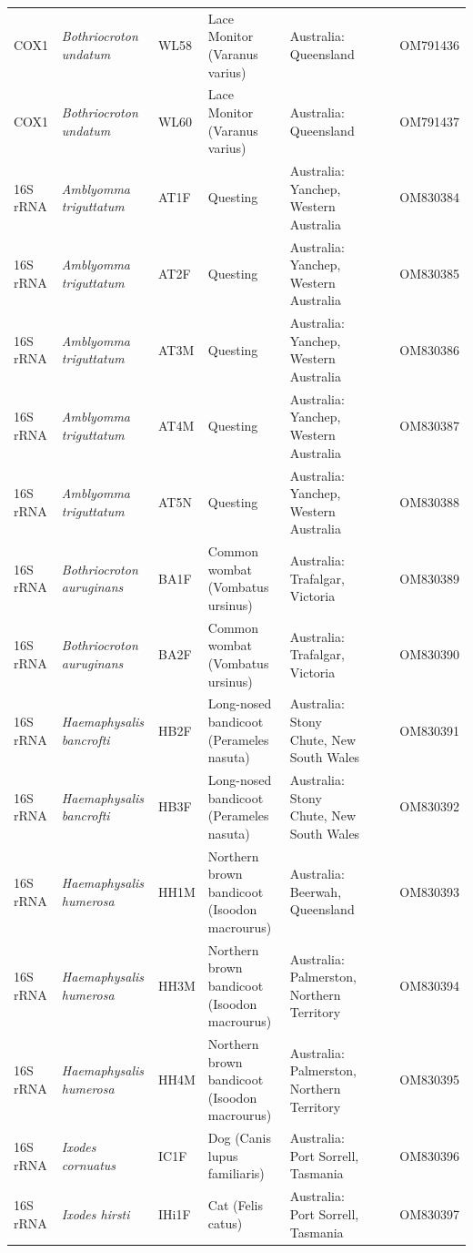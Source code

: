 \documentclass[a4paper, nobind]{templates/ociamthesis}
\begin{document}
\begin{landscape}
\begin{longtable}[t]{l>{}lllllll}
COX1 & \em{Bothriocroton undatum} & WL58 & Lace Monitor (Varanus varius) & Australia: Queensland &  &  & OM791436\\
COX1 & \em{Bothriocroton undatum} & WL60 & Lace Monitor (Varanus varius) & Australia: Queensland &  &  & OM791437\\
16S rRNA & \em{Amblyomma triguttatum} & AT1F & Questing & Australia: Yanchep, Western Australia &  &  & OM830384\\
16S rRNA & \em{Amblyomma triguttatum} & AT2F & Questing & Australia: Yanchep, Western Australia &  &  & OM830385\\
16S rRNA & \em{Amblyomma triguttatum} & AT3M & Questing & Australia: Yanchep, Western Australia &  &  & OM830386\\
16S rRNA & \em{Amblyomma triguttatum} & AT4M & Questing & Australia: Yanchep, Western Australia &  &  & OM830387\\
16S rRNA & \em{Amblyomma triguttatum} & AT5N & Questing & Australia: Yanchep, Western Australia &  &  & OM830388\\
16S rRNA & \em{Bothriocroton auruginans} & BA1F & Common wombat (Vombatus ursinus) & Australia: Trafalgar, Victoria &  &  & OM830389\\
16S rRNA & \em{Bothriocroton auruginans} & BA2F & Common wombat (Vombatus ursinus) & Australia: Trafalgar, Victoria &  &  & OM830390\\
16S rRNA & \em{Haemaphysalis bancrofti} & HB2F & Long-nosed bandicoot (Perameles nasuta) & Australia: Stony Chute, New South Wales &  &  & OM830391\\
16S rRNA & \em{Haemaphysalis bancrofti} & HB3F & Long-nosed bandicoot (Perameles nasuta) & Australia: Stony Chute, New South Wales &  &  & OM830392\\
16S rRNA & \em{Haemaphysalis humerosa} & HH1M & Northern brown bandicoot (Isoodon macrourus) & Australia: Beerwah, Queensland &  &  & OM830393\\
16S rRNA & \em{Haemaphysalis humerosa} & HH3M & Northern brown bandicoot (Isoodon macrourus) & Australia: Palmerston, Northern Territory &  &  & OM830394\\
16S rRNA & \em{Haemaphysalis humerosa} & HH4M & Northern brown bandicoot (Isoodon macrourus) & Australia: Palmerston, Northern Territory &  &  & OM830395\\
16S rRNA & \em{Ixodes cornuatus} & IC1F & Dog (Canis lupus familiaris) & Australia: Port Sorrell, Tasmania &  &  & OM830396\\
16S rRNA & \em{Ixodes hirsti} & IHi1F & Cat (Felis catus) & Australia: Port Sorrell, Tasmania &  &  & OM830397\\

\end{longtable}
\end{landscape}
\end{document}
